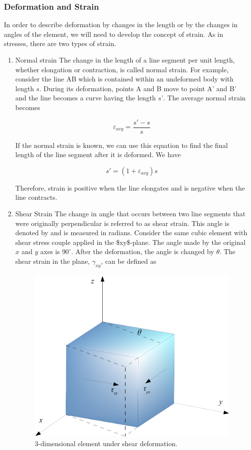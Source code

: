 \documentclass[a4paper,openany,nobib]{tufte-book}
\begin{document}
\subsubsection{Deformation and Strain}
\label{deformation-and-strain}
In order to describe deformation by changes in the length or by the
changes in angles of the element, we will need to develop the concept of
strain. As in stresses, there are two types of strain.

\begin{enumerate}
\item Normal strain
\label{normal-strain}
The change in the length of a line segment per unit length, whether
elongation or contraction, is called normal strain. For example,
consider the line AB which is contained within an undeformed body with
length \(s\). During its deformation, points A and B move to point A' and
B' and the line becomes a curve having the length \(s’\). The average
normal strain becomes

$$\varepsilon _{avg} = \frac{s' - s}{s}$$

If the normal strain is known, we can use this equation to find the
final length of the line segment after it is deformed. We have

$$s' = (1 + \varepsilon _{avg})s$$

Therefore, strain is positive when the line elongates and is negative
when the line contracts.

\item Shear Strain
\label{shear-strain}
The change in angle that occurs between two line segments that were
originally perpendicular is referred to as shear strain. This angle is
denoted by and is measured in radians. Consider the same cubic element
with shear stress couple applied in the \$xy\$-plane. The angle made by
the original \(x\) and \(y\) axes is \(90^{\circ}\). After the deformation, the
angle is changed by \(\theta\). The shear strain in the plane,
\(\gamma_{xy}\), can be defined as


\begin{figure}[htbp]
\centering
\includegraphics[width=.9\linewidth]{pictures/Static-body-load-analysis/3d-shear-deformation.pdf}
\caption{3-dimensional element under shear deformation.}
\end{figure}


\end{enumerate}
\end{document}
